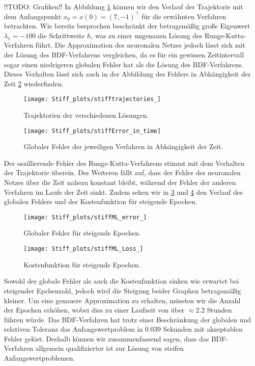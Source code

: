 !!TODO: Grafiken!!
In Abbildung \ref{fig:stiff-trajectories} können wir den Verlauf der Trajektorie mit dem Anfangspunkt
$x_0=x(0)=(7,-1)^{\intercal}$ für die erwähnten Verfahren betrachten. Wie bereits besprochen beschränkt der betragsmäßig große
Eigenwert $\lambda_1=-100$ die Schrittweite $h$, was zu einer ungenauen Lösung des Runge-Kutta-Verfahren führt. Die
Approximation des neuronalen Netzes jedoch lässt sich mit der Lösung des BDF-Verfahrens vergleichen, da es für ein
gewissen Zeitintervall sogar einen niedrigeren globalen Fehler hat als die Lösung des BDF-Verfahrens.
Dieses Verhalten lässt sich auch in der Abbildung des Fehlers in Abhängigkeit der Zeit \ref{fig:stiff-error-in-time}
wiederfinden.
\begin{figure}
       \centering
       \texttt{[image: Stiff\_plots/stifftrajectories\_]}
       \caption{Trajektorien der verschiedenen Lösungen.}
       \label{fig:stiff-trajectories}
\end{figure}
\begin{figure}
       \centering
       \texttt{[image: Stiff\_plots/stiffError\_in\_time]}
       \caption{Globaler Fehler  der jeweiligen Verfahren in Abhängigkeit der Zeit.}
       \label{fig:stiff-error-in-time}
\end{figure}
Der oszillierende Fehler des Runge-Kutta-Verfahrens stimmt mit dem Verhalten der Trajektorie überein. Des Weiteren fällt
auf, dass der Fehler des neuronalen Netzes über die Zeit nahezu konstant bleibt, während der Fehler der anderen
Verfahren im Laufe der Zeit sinkt. Zudem sehen wir in \ref{fig:stiff-error} und \ref{fig:stiff-loss} den Verlauf des
globalen Fehlers und der Kostenfunktion für steigende Epochen.
\begin{figure}
       \centering
       \texttt{[image: Stiff\_plots/stiffML\_error\_]}
       \caption{Globaler Fehler für steigende Epochen.}
       \label{fig:stiff-error}
\end{figure}
\begin{figure}
       \centering
       \texttt{[image: Stiff\_plots/stiffML\_Loss\_]}
       \caption{Kostenfunktion für steigende Epochen.}
       \label{fig:stiff-loss}
\end{figure}
Sowohl der globale Fehler als auch die Kostenfunktion sinken wie erwartet bei steigender Epchenzahl, jedoch wird die
Steigung beider Graphen betragsmäßig kleiner. Um eine genauere Approximation zu erhalten, müssten wir die Anzahl der
Epochen erhöhen, wobei dies zu einer Laufzeit von über $\approx 2.2$ Stunden führen würde. Das BDF-Verfahren hat
trotz einer Beschränkung der globalen und relativen Toleranz das Anfangswertproblem in $0.039$ Sekunden mit akzeptablen
Fehler gelöst. Deshalb können wir zusammenfassend sagen, dass das BDF-Verfahren allgemein qualifizierter ist zur Lösung
von steifen Anfangswertproblemen.

